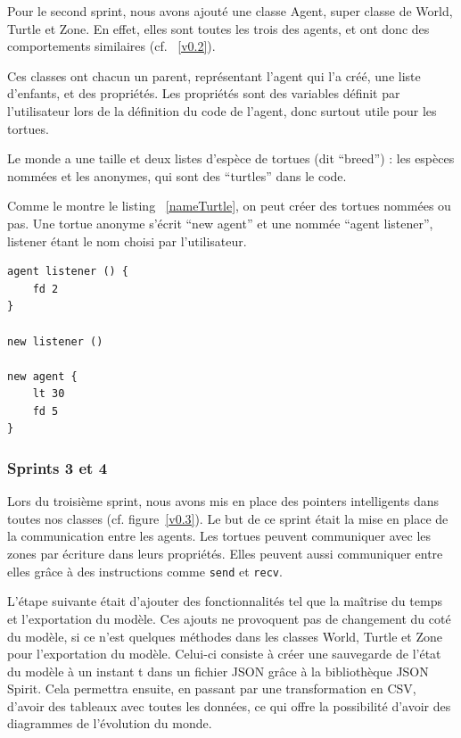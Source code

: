 Pour le second sprint, nous avons ajouté une classe Agent, super classe de World, Turtle et Zone. En effet, elles sont toutes les trois des agents, et ont donc des comportements similaires (cf. ~\ref{v0.2}).

Ces classes ont chacun un parent, représentant l'agent qui l'a créé, une liste d'enfants, et des propriétés. Les propriétés sont des variables définit par l'utilisateur lors de la définition du code de l'agent, donc surtout utile pour les tortues.

Le monde a une taille et deux listes d'espèce de tortues (dit \enquote{breed}) : les espèces nommées et les anonymes, qui sont des \enquote{turtles} dans le code.

Comme le montre le listing ~\ref{nameTurtle}, on peut créer des tortues nommées ou pas. Une tortue anonyme s'écrit \enquote{new agent} et une nommée \enquote{agent listener}, listener étant le nom choisi par l'utilisateur.

\begin{lstlisting}[label=nameTurtle,caption=Nommage lors de la création d'une tortue]
agent listener () {
	fd 2
}

new listener ()

new agent {
	lt 30
	fd 5
}
\end{lstlisting}

\subsubsection{Sprints 3 et 4}
Lors du troisième sprint, nous avons mis en place des pointers intelligents dans toutes nos classes (cf. figure~\ref{v0.3}). Le but de ce sprint était la mise en place de la communication entre les agents. Les tortues peuvent communiquer avec les zones par écriture dans leurs propriétés. Elles peuvent aussi communiquer entre elles grâce à des instructions comme \verb|send| et \verb|recv|.

L'étape suivante était d'ajouter des fonctionnalités tel que la maîtrise du temps et l'exportation du modèle. Ces ajouts ne provoquent pas de changement du coté du modèle, si ce n'est quelques méthodes dans les classes World, Turtle et Zone pour l'exportation du modèle.
Celui-ci consiste à créer une sauvegarde de l'état du modèle à un instant t dans un fichier JSON grâce à la bibliothèque JSON Spirit.
Cela permettra ensuite, en passant par une transformation en CSV, d'avoir des tableaux avec toutes les données, ce qui offre la possibilité d'avoir des diagrammes de l'évolution du monde.

